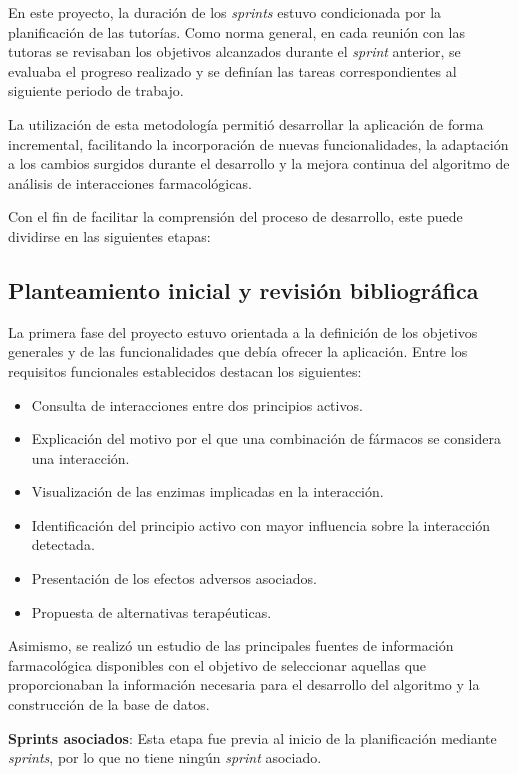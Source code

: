 En este proyecto, la duración de los \textit{sprints} estuvo condicionada por la planificación de las tutorías. Como norma general, en cada reunión con las tutoras se revisaban los objetivos alcanzados durante el \textit{sprint} anterior, se evaluaba el progreso realizado y se definían las tareas correspondientes al siguiente periodo de trabajo.

La utilización de esta metodología permitió desarrollar la aplicación de forma incremental, facilitando la incorporación de nuevas funcionalidades, la adaptación a los cambios surgidos durante el desarrollo y la mejora continua del algoritmo de análisis de interacciones farmacológicas.

Con el fin de facilitar la comprensión del proceso de desarrollo, este puede dividirse en las siguientes etapas:

\subsection*{Planteamiento inicial y revisión bibliográfica}

La primera fase del proyecto estuvo orientada a la definición de los objetivos generales y de las funcionalidades que debía ofrecer la aplicación. Entre los requisitos funcionales establecidos destacan los siguientes:

\begin{itemize}
    \item Consulta de interacciones entre dos principios activos.
    \item Explicación del motivo por el que una combinación de fármacos se considera una interacción.
    \item Visualización de las enzimas implicadas en la interacción.
    \item Identificación del principio activo con mayor influencia sobre la interacción detectada.
    \item Presentación de los efectos adversos asociados.
    \item Propuesta de alternativas terapéuticas.
\end{itemize}

Asimismo, se realizó un estudio de las principales fuentes de información farmacológica disponibles con el objetivo de seleccionar aquellas que proporcionaban la información necesaria para el desarrollo del algoritmo y la construcción de la base de datos.

\textbf{Sprints asociados}: Esta etapa fue previa al inicio de la planificación mediante \textit{sprints}, por lo que no tiene ningún \textit{sprint} asociado.

